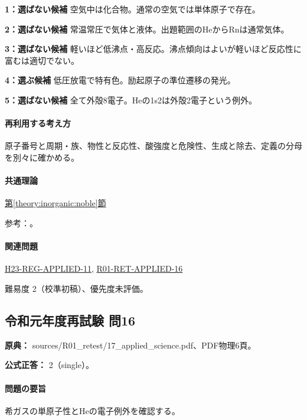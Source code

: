 \noindent\textbf{1：選ばない候補} 空気中は化合物。通常の空気では単体原子で存在。\par

\noindent\textbf{2：選ばない候補} 常温常圧で気体と液体。出題範囲のHeからRnは通常気体。\par

\noindent\textbf{3：選ばない候補} 軽いほど低沸点・高反応。沸点傾向はよいが軽いほど反応性に富むは適切でない。\par

\noindent\textbf{4：選ぶ候補} 低圧放電で特有色。励起原子の準位遷移の発光。\par

\noindent\textbf{5：選ばない候補} 全て外殻8電子。Heの1s2は外殻2電子という例外。\par

\paragraph{再利用する考え方} 原子番号と周期・族、物性と反応性、酸強度と危険性、生成と除去、定義の分母を別々に確かめる。

\paragraph{共通理論} \hyperref[theory:inorganic:noble]{第\ref*{theory:inorganic:noble}節}

\par 参考：\cite{inorganic_noble_ref}。

\paragraph{関連問題} \hyperref[q:h23-reg-applied-11]{H23-REG-APPLIED-11}, \hyperref[q:r01-ret-applied-16]{R01-RET-APPLIED-16}

\par 難易度 2（校準初稿）、優先度未評価。

\subsection{令和元年度再試験 問16}
\label{q:r01-ret-applied-16}

\noindent\textbf{原典：} sources/R01\_retest/17\_applied\_science.pdf、PDF物理6頁。

\textbf{公式正答：} 2（single）。

\paragraph{問題の要旨} 希ガスの単原子性とHeの電子例外を確認する。

